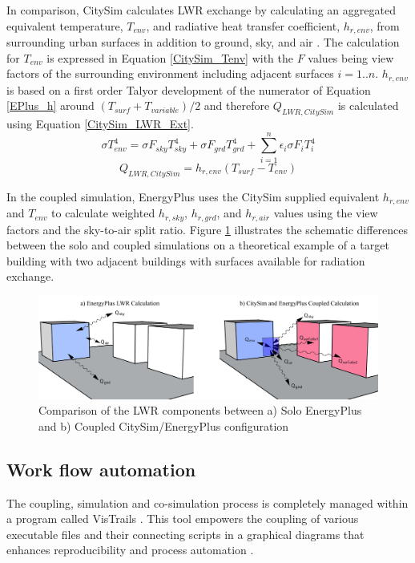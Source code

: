 \documentclass{tBPS2e}
\theoremstyle{plain}
\theoremstyle{definition}
\theoremstyle{remark}
\begin{document}
In comparison, CitySim calculates LWR exchange by calculating an aggregated equivalent temperature, $T_{env}$, and radiative heat transfer coefficient, $h_{r,env}$, from surrounding urban surfaces in addition to ground, sky, and air \citep{Robinson:2009tm}. The calculation for $T_{env}$ is expressed in Equation \ref{CitySim_Tenv} with the $F$ values being view factors of the surrounding environment including adjacent surfaces $i=1..n$. $h_{r,env}$ is based on a first order Talyor development of the numerator of Equation \ref{EPlus_h} around $(T_{surf}+T_{variable})/2$ and therefore $Q_{LWR,CitySim}$ is calculated using Equation \ref{CitySim_LWR_Ext}.
\begin{equation} \label{CitySim_Tenv} 
\sigma T_{env}^4 = \sigma F_{sky}T_{sky}^4 +\sigma F_{grd}T_{grd}^4 + \sum_{i=1}^{n} \epsilon_i \sigma F_{i}T_{i}^4
\end{equation}
\begin{equation} \label{CitySim_LWR_Ext} 
Q_{LWR,CitySim} = h_{r,env}(T_{surf}-T_{env})
\end{equation}

In the coupled simulation, EnergyPlus uses the CitySim supplied equivalent $h_{r,env}$ and $T_{env}$ to calculate weighted $h_{r,sky}$, $h_{r,grd}$, and $h_{r,air}$ values using the view factors and the sky-to-air split ratio. Figure \ref{combinedLWR} illustrates the schematic differences between the solo and coupled simulations on a theoretical example of a target building with two adjacent buildings with surfaces available for radiation exchange.

\begin{figure}[H]
  \centering
  \includegraphics[width=1.0\textwidth]{figures/LWRCalc_Combined_V3}
  \caption{Comparison of the LWR components between a) Solo EnergyPlus and b) Coupled CitySim/EnergyPlus configuration \citep{Miller:2015vk}
  \label{combinedLWR}}
\end{figure}

\subsection{Work flow automation}
The coupling, simulation and co-simulation process is completely managed within a program called VisTrails \citep{Anonymous:Cayf2tu7}. This tool empowers the coupling of various executable files and their connecting scripts in a graphical diagrams that enhances reproducibility and process automation \citep{Freire:2014tt}.
\end{document}
